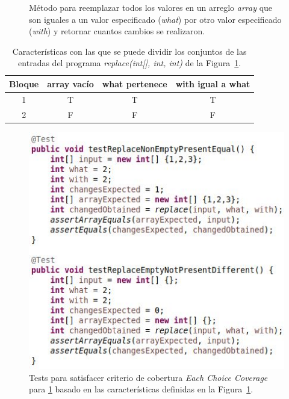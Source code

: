 \begin{figure}
	
	\caption[M\'etodo \emph{replace(int[], int, int)}]{M\'etodo para reemplazar todos los valores en un arreglo \emph{array} que son iguales a un valor especificado (\emph{what}) por otro valor especificado (\emph{with}) y retornar cuantos cambios se realizaron.}
	\label{figures.code.replaceExample}
\end{figure}

\begin{table}[]
	\caption[Caracter\'isticas para las entradas de \emph{replace(int[], int, int)}]{Caracter\'isticas con las que se puede dividir los conjuntos de las entradas del programa \emph{replace(int{[]}, int, int)} de la Figura~\ref{figures.code.replaceExample}.}
	\label{tables.example.codeCoverage}
	\centering
	\begin{tabular}{|c|ccc|}
		\hline
		Bloque & array vac\'io & what pertenece & with igual a what \\ \hline
		1 & T & T & T \\ \hline
		2 & F & F & F \\ \hline
	\end{tabular}
\end{table}

\begin{figure}
	\centering
	\includegraphics[width=.90\linewidth]{figures/replaceTestsEachChoice.JPG}
	\caption[Tests basados en \emph{ECC} para la Figura~\ref{figures.code.replaceExample} y las caracter\'isticas en la Tabla~\ref{tables.example.codeCoverage}]{Tests para satisfacer criterio de cobertura \emph{Each Choice Coverage} para \ref{figures.code.replaceExample} basado en las caracter\'isticas definidas en la Figura~\ref{tables.example.codeCoverage}.}
	\label{figures.examples.coverage.eccTests}
\end{figure}

